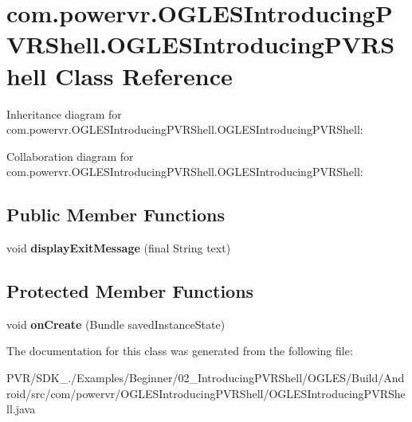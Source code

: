 \hypertarget{classcom_1_1powervr_1_1_o_g_l_e_s_introducing_p_v_r_shell_1_1_o_g_l_e_s_introducing_p_v_r_shell}{\section{com.\+powervr.\+O\+G\+L\+E\+S\+Introducing\+P\+V\+R\+Shell.\+O\+G\+L\+E\+S\+Introducing\+P\+V\+R\+Shell Class Reference}
\label{classcom_1_1powervr_1_1_o_g_l_e_s_introducing_p_v_r_shell_1_1_o_g_l_e_s_introducing_p_v_r_shell}
}


Inheritance diagram for com.\+powervr.\+O\+G\+L\+E\+S\+Introducing\+P\+V\+R\+Shell.\+O\+G\+L\+E\+S\+Introducing\+P\+V\+R\+Shell\+:


Collaboration diagram for com.\+powervr.\+O\+G\+L\+E\+S\+Introducing\+P\+V\+R\+Shell.\+O\+G\+L\+E\+S\+Introducing\+P\+V\+R\+Shell\+:
\subsection*{Public Member Functions}
\begin{DoxyCompactItemize}
\item 
\hypertarget{classcom_1_1powervr_1_1_o_g_l_e_s_introducing_p_v_r_shell_1_1_o_g_l_e_s_introducing_p_v_r_shell_a8b37de33c624ca03db08cef9c46631e8}{void {\bfseries display\+Exit\+Message} (final String text)}\label{classcom_1_1powervr_1_1_o_g_l_e_s_introducing_p_v_r_shell_1_1_o_g_l_e_s_introducing_p_v_r_shell_a8b37de33c624ca03db08cef9c46631e8}

\end{DoxyCompactItemize}
\subsection*{Protected Member Functions}
\begin{DoxyCompactItemize}
\item 
\hypertarget{classcom_1_1powervr_1_1_o_g_l_e_s_introducing_p_v_r_shell_1_1_o_g_l_e_s_introducing_p_v_r_shell_aff57e9a578f4ae0b848b7c1649d91b35}{void {\bfseries on\+Create} (Bundle saved\+Instance\+State)}\label{classcom_1_1powervr_1_1_o_g_l_e_s_introducing_p_v_r_shell_1_1_o_g_l_e_s_introducing_p_v_r_shell_aff57e9a578f4ae0b848b7c1649d91b35}

\end{DoxyCompactItemize}


The documentation for this class was generated from the following file\+:\begin{DoxyCompactItemize}
\item 
P\+V\+R/\+S\+D\+K\+\_./\+Examples/\+Beginner/02\+\_\+\+Introducing\+P\+V\+R\+Shell/\+O\+G\+L\+E\+S/\+Build/\+Android/src/com/powervr/\+O\+G\+L\+E\+S\+Introducing\+P\+V\+R\+Shell/O\+G\+L\+E\+S\+Introducing\+P\+V\+R\+Shell.\+java\end{DoxyCompactItemize}
